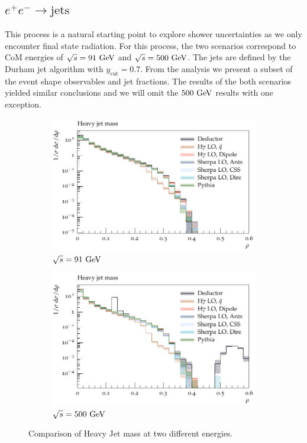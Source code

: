 \subsection{$e^+e^-\to\text{jets}$}
\label{sec:psunc:results:ee}
This process is a natural starting point to explore shower uncertainties as we only encounter final state radiation. For this process, the two scenarios correspond to CoM energies of $\sqrt{s}=91~\textrm{GeV}$ and $\sqrt{s}=500~\textrm{GeV}$. The jets are defined by the Durham jet algorithm with $y_\mathrm{cut}=0.7$. From the analysis we present a subset of the event shape observables and jet fractions. The results of the both scenarios yielded similar conclusions and we will omit the $500~\textrm{GeV}$ results with one exception. 
\begin{figure}[h]
  \centering
  \begin{subfigure}[t]{0.49\textwidth}
    \includegraphics[width=\textwidth]{plots/EE-91-MuShower/MC_EETOJETS/HeavyJetMass.pdf}
    \caption{$\sqrt{s} = 91~\textrm{GeV}$}
    \label{fig:ee:heavyjetmass:91}
  \end{subfigure}
  \begin{subfigure}[t]{0.49\textwidth}
    \includegraphics[width=\textwidth]{plots/EE-500-MuShower/MC_EETOJETS/HeavyJetMass.pdf}
    \caption{$\sqrt{s} = 500~\textrm{GeV}$}
    \label{fig:ee:heavyjetmass:500}
  \end{subfigure}
  \caption{Comparison of Heavy Jet mass at two different energies.}
  \label{fig:ee:heavyjetmass}
\end{figure}


